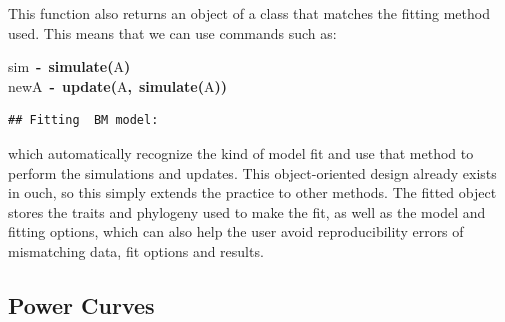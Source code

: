 \documentclass{elsarticle}
\makeatletter
\newcommand{\hlfunctioncall}[1]{\textcolor[rgb]{.5,0,.33}{\textbf{#1}}}%
\newcommand{\hlkeyword}[1]{\textbf{#1}}%
\newcommand{\hlassignement}[1]{\textbf{#1}}%
\newcommand{\hlsymbol}[1]{#1}%
\newcommand{\hlstd}[1]{\textcolor[rgb]{0,0,0}{#1}}%
\newenvironment{kframe}{%
 \def\FrameCommand##1{\hskip\@totalleftmargin \hskip-\fboxsep
 \colorbox{shadecolor}{##1}\hskip-\fboxsep
     \hskip-\linewidth \hskip-\@totalleftmargin \hskip\columnwidth}%
 \MakeFramed {\advance\hsize-\width
   \@totalleftmargin\z@ \linewidth\hsize
   \@setminipage}}%
 {\par\unskip\endMakeFramed}
\newenvironment{knitrout}{}{} %
\makeatother
\begin{document}
This function also returns an object of a class that matches the fitting method used.  This means that we can use commands such as:
\begin{knitrout}
\color{fgcolor}\begin{kframe}
\begin{flushleft}
\ttfamily\noindent
\hlsymbol{sim}{\ }\hlassignement{\usebox{\hlnormalsizeboxlessthan}-}{\ }\hlfunctioncall{simulate}\hlkeyword{(}\hlsymbol{A}\hlkeyword{)}\hspace*{\fill}\\
\hlstd{}\hlsymbol{newA}{\ }\hlassignement{\usebox{\hlnormalsizeboxlessthan}-}{\ }\hlfunctioncall{update}\hlkeyword{(}\hlsymbol{A}\hlkeyword{,}{\ }\hlfunctioncall{simulate}\hlkeyword{(}\hlsymbol{A}\hlkeyword{)}\hlkeyword{)}\mbox{}
\normalfont
\end{flushleft}
\begin{verbatim}
## Fitting  BM model:
\end{verbatim}
\end{kframe}
\end{knitrout}

which automatically recognize the kind of model fit and use that method to perform the simulations and updates. This object-oriented design already exists in ouch, so this simply extends the practice to other methods.  The fitted object stores the traits and phylogeny used to make the fit, as well as the model and fitting options, which can also help the user avoid reproducibility errors of mismatching data, fit options and results.


\subsection{Power Curves}
\end{document}
